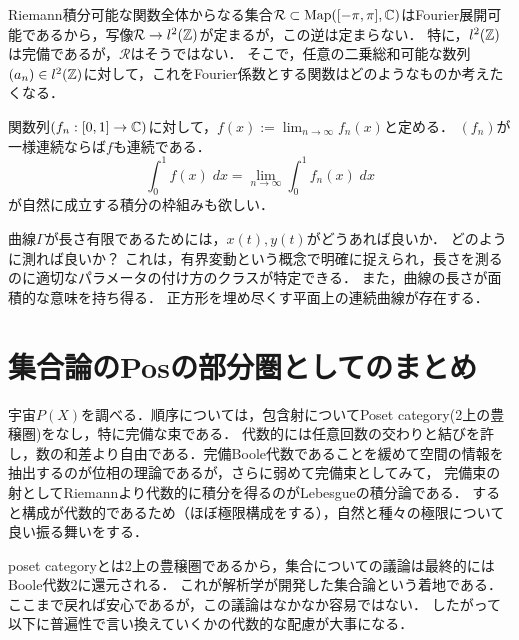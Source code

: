 \documentclass[uplatex, dvipdfmx]{jsreport}
\begin{document}
\begin{question}[Fourier係数を指定して得る関数はどのような関数か？]
    Riemann積分可能な関数全体からなる集合$\mathcal{R}\subset\mathrm{Map}([-\pi,\pi],\mathbb{C})$はFourier展開可能であるから，写像$\mathcal{R}\to l^2(\mathbb{Z})$が定まるが，この逆は定まらない．
    特に，$l^2(\mathbb{Z})$は完備であるが，$\mathcal{R}$はそうではない．
    そこで，任意の二乗総和可能な数列$(a_n)\in l^2(\mathbb{Z})$に対して，これをFourier係数とする関数はどのようなものか考えたくなる．
\end{question}

\begin{question}[連続関数の極限はどんな関数か？]
    関数列$(f_n:[0,1]\to\mathbb{C})$に対して，$f(x):=\lim_{n\to\infty}f_n(x)$と定める．
    $(f_n)$が一様連続ならば$f$も連続である．
    \[\int^1_0f(x)\;dx=\lim_{n\to\infty}\int^1_0f_n(x)\;dx\]
    が自然に成立する積分の枠組みも欲しい．
\end{question}

\begin{question}[曲線の長さとフラクタル]
    曲線$\Gamma$が長さ有限であるためには，$x(t),y(t)$がどうあれば良いか．
    どのように測れば良いか？
    これは，有界変動という概念で明確に捉えられ，長さを測るのに適切なパラメータの付け方のクラスが特定できる．
    また，曲線の長さが面積的な意味を持ち得る．
    正方形を埋め尽くす平面上の連続曲線が存在する．
\end{question}

\section{集合論のPosの部分圏としてのまとめ}

\begin{tcolorbox}[colframe=ForestGreen, colback=ForestGreen!10!white,breakable,colbacktitle=ForestGreen!40!white,coltitle=black,fonttitle=\bfseries\sffamily,
title=]
    宇宙$P(X)$を調べる．順序については，包含射についてPoset category(2上の豊穣圏)をなし，特に完備な束である．
    代数的には任意回数の交わりと結びを許し，数の和差より自由である．完備Boole代数であることを緩めて空間の情報を抽出するのが位相の理論であるが，さらに弱めて完備束としてみて，
    完備束の射としてRiemannより代数的に積分を得るのがLebesgueの積分論である．
    すると構成が代数的であるため（ほぼ極限構成をする），自然と種々の極限について良い振る舞いをする．

    poset categoryとは2上の豊穣圏であるから，集合についての議論は最終的にはBoole代数$2$に還元される．
    これが解析学が開発した集合論という着地である．
    ここまで戻れば安心であるが，この議論はなかなか容易ではない．
    したがって以下に普遍性で言い換えていくかの代数的な配慮が大事になる．
\end{tcolorbox}
\end{document}
